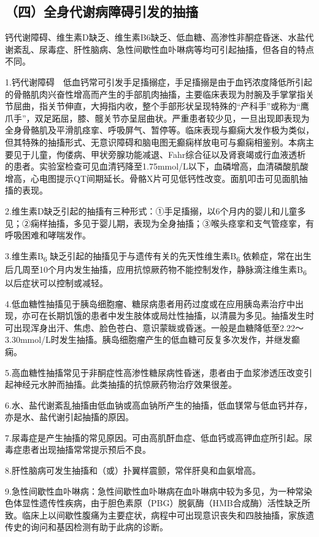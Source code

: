 \subsection{（四）全身代谢病障碍引发的抽搐}

钙代谢障碍、维生素D缺乏、维生素B6缺乏、低血糖、高渗性非酮症昏迷、水盐代谢紊乱、尿毒症、肝性脑病、急性间歇性血卟啉病等均可引起抽搐，但各自的特点不同。

1.钙代谢障碍　低血钙常可引发手足搐搦症，手足搐搦是由于血钙浓度降低所引起的骨骼肌肉兴奋性增高而产生的手部肌肉抽搐，主要临床表现为肘腕及手掌掌指关节屈曲，指关节伸直，大拇指内收，整个手部形状呈现特殊的“产科手”或称为“鹰爪手”，双足跖屈，膝、髋关节亦呈屈曲状。严重患者较少见，一旦出现即表现为全身骨骼肌及平滑肌痉挛、呼吸屏气、暂停等。临床表现与癫痫大发作极为类似，但其特殊的抽搐形式、无意识障碍和脑电图无癫痫样放电可与癫痫相鉴别。本病主要见于儿童，佝偻病、甲状旁腺功能减退、Fahr综合征以及肾衰竭或行血液透析的患者。实验室检查可见血清钙降至1.75mmol/L以下，血磷增高，血清磷酸肌酸增高，心电图提示QT间期延长。骨骼X片可见低钙性改变。面肌叩击可见面肌抽搐的表现。

2.维生素D缺乏引起的抽搐有三种形式：①手足搐搦，以6个月内的婴儿和儿童多见；②痫样抽搐，多见于婴儿期，表现为全身抽搐；③喉头痉挛和支气管痉挛，有呼吸困难和哮喘发作。

3.维生素B\textsubscript{6}
缺乏引起的抽搐见于与遗传有关的先天性维生素B\textsubscript{6}
依赖症，常在出生后几周至10个月内发生抽搐，应用抗惊厥药物不能控制发作，静脉滴注维生素B\textsubscript{6}
以后症状可以控制或减轻。

4.低血糖性抽搐见于胰岛细胞瘤、糖尿病患者用药过度或在应用胰岛素治疗中出现，亦可在长期饥饿的患者中发生肢体或局灶性抽搐，以清晨为多见。抽搐发生时可出现浑身出汗、焦虑、脸色苍白、意识蒙眬或昏迷。一般是血糖降低至2.22～3.30mmol/L时发生抽搐。胰岛细胞瘤产生的低血糖可反复多次发作，并继发癫痫。

5.高血糖性抽搐常见于非酮症性高渗性糖尿病性昏迷，患者由于血浆渗透压改变引起神经元水肿而抽搐。此类抽搐的抗惊厥药物治疗效果很差。

6.水、盐代谢紊乱抽搐由低血钠或高血钠所产生的抽搐，低血镁常与低血钙并存，亦是水、盐代谢引起抽搐的原因。

7.尿毒症是产生抽搐的常见原因。可由高肌酐血症、低血钙或高钾血症所引起。尿毒症患者出现抽搐常常提示预后不良。

8.肝性脑病可发生抽搐和（或）扑翼样震颤，常伴肝臭和血氨增高。

9.急性间歇性血卟啉病：急性间歇性血卟啉病在血卟啉病中较为多见，为一种常染色体显性遗传性疾病，由于胆色素原（PBG）脱氨酶（HMB合成酶）活性缺乏所致。临床上以间歇性腹痛为主要症状，病程中可出现意识丧失和四肢抽搐，家族遗传史的询问和基因检测有助于此病的诊断。

